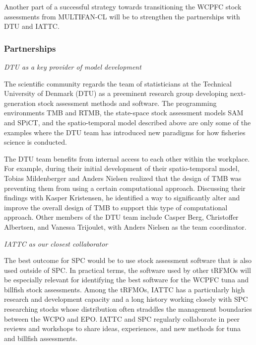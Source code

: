 \documentclass{SCreport}
\begin{document}
Another part of a successful strategy towards transitioning the WCPFC stock
assessments from MULTIFAN-CL will be to strengthen the partnerships with DTU and
IATTC.

\vspace{2ex}

\subsubsection{Partnerships}

\textit{DTU as a key provider of model development}

The scientific community regards the team of statisticians at the Technical
University of Denmark (DTU) as a preeminent research group developing
next-generation stock assessment methods and software. The programming
environments TMB and RTMB, the state-space stock assessment models SAM and
SPiCT, and the spatio-temporal model described above are only some of the
examples where the DTU team has introduced new paradigms for how fisheries
science is conducted.

\newpage

The DTU team benefits from internal access to each other within the workplace.
For example, during their initial development of their spatio-temporal model,
Tobias Mildenberger and Anders Nielsen realized that the design of TMB was
preventing them from using a certain computational approach. Discussing their
findings with Kasper Kristensen, he identified a way to significantly alter and
improve the overall design of TMB to support this type of computational
approach. Other members of the DTU team include Casper Berg, Christoffer
Albertsen, and Vanessa Trijoulet, with Anders Nielsen as the team coordinator.

\vspace{2ex}

\textit{IATTC as our closest collaborator}

The best outcome for SPC would be to use stock assessment software that is also
used outside of SPC. In practical terms, the software used by other tRFMOs will
be especially relevant for identifying the best software for the WCPFC tuna and
billfish stock assessments. Among the tRFMOs, IATTC has a particularly high
research and development capacity and a long history working closely with SPC
researching stocks whose distribution often straddles the management boundaries
between the WCPO and EPO. IATTC and SPC regularly collaborate in peer reviews
and workshops to share ideas, experiences, and new methods for tuna and billfish
assessments.
\end{document}
